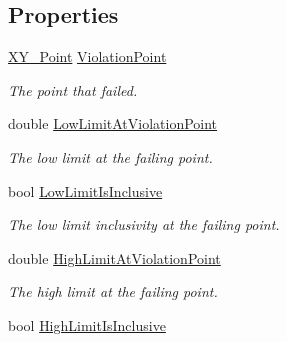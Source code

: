 \subsection*{Properties}
\begin{DoxyCompactItemize}
\item 
\mbox{\hyperlink{struct_c_s_i_1_1_library_1_1_data_types_1_1_x_y___point}{X\+Y\+\_\+\+Point}} \mbox{\hyperlink{class_c_s_i_1_1_library_1_1_array_utilities_1_1_array_limit_checks_1_1_violation_addb0a13f513102bea8226f4c6711891d}{Violation\+Point}}
\begin{DoxyCompactList}\small\item\em The point that failed. \end{DoxyCompactList}\item 
double \mbox{\hyperlink{class_c_s_i_1_1_library_1_1_array_utilities_1_1_array_limit_checks_1_1_violation_aa650d5f92172c2cbe2f8e34146646e0f}{Low\+Limit\+At\+Violation\+Point}}
\begin{DoxyCompactList}\small\item\em The low limit at the failing point. \end{DoxyCompactList}\item 
bool \mbox{\hyperlink{class_c_s_i_1_1_library_1_1_array_utilities_1_1_array_limit_checks_1_1_violation_abb72abe99321cc67c1bce21cbaadd33f}{Low\+Limit\+Is\+Inclusive}}
\begin{DoxyCompactList}\small\item\em The low limit inclusivity at the failing point. \end{DoxyCompactList}\item 
double \mbox{\hyperlink{class_c_s_i_1_1_library_1_1_array_utilities_1_1_array_limit_checks_1_1_violation_a0dffbe18b46285ebb2c9905aab6a42bc}{High\+Limit\+At\+Violation\+Point}}
\begin{DoxyCompactList}\small\item\em The high limit at the failing point. \end{DoxyCompactList}\item 
bool \mbox{\hyperlink{class_c_s_i_1_1_library_1_1_array_utilities_1_1_array_limit_checks_1_1_violation_a553d3fe940dee1a09f69c86147491320}{High\+Limit\+Is\+Inclusive}}

\end{DoxyCompactItemize}
